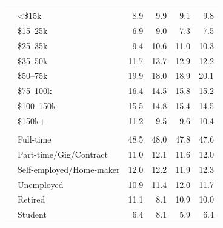 \begin{tabular}{llrrrr}
\addlinespace
\multicolumn{6}{l}{\textbf{Household income}} \\
 & <\$15k & 8.9 & 9.9 & 9.1 & 9.8 \\
 & \$15--25k & 6.9 & 9.0 & 7.3 & 7.5 \\
 & \$25--35k & 9.4 & 10.6 & 11.0 & 10.3 \\
 & \$35--50k & 11.7 & 13.7 & 12.9 & 12.2 \\
 & \$50--75k & 19.9 & 18.0 & 18.9 & 20.1 \\
 & \$75--100k & 16.4 & 14.5 & 15.8 & 15.2 \\
 & \$100--150k & 15.5 & 14.8 & 15.4 & 14.5 \\
 & \$150k+ & 11.2 & 9.5 & 9.6 & 10.4 \\
\addlinespace
\multicolumn{6}{l}{\textbf{Employment}} \\
 & Full-time & 48.5 & 48.0 & 47.8 & 47.6 \\
 & Part-time/Gig/Contract & 11.0 & 12.1 & 11.6 & 12.0 \\
 & Self-employed/Home-maker & 12.0 & 12.2 & 11.9 & 12.3 \\
 & Unemployed & 10.9 & 11.4 & 12.0 & 11.7 \\
 & Retired & 11.1 & 8.1 & 10.9 & 10.0 \\
 & Student & 6.4 & 8.1 & 5.9 & 6.4 \\
\bottomrule
\end{tabular}